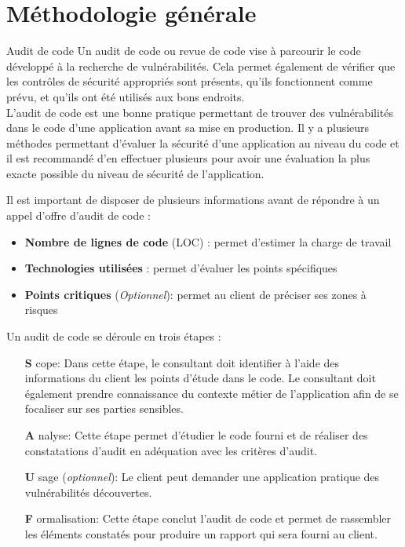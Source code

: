 \section{Méthodologie générale}

\begin{Define}{Audit de code}
Un audit de code ou revue de code vise à parcourir le code développé à la recherche de vulnérabilités. Cela permet également de vérifier que les contrôles de sécurité appropriés sont présents, qu'ils fonctionnent comme prévu, et qu'ils ont été utilisés aux bons endroits.\\
L’audit de code est une bonne pratique permettant de trouver des vulnérabilités dans le code d’une application avant sa mise en production. Il y a plusieurs méthodes permettant d’évaluer la sécurité d’une application au niveau du code et il est recommandé d’en effectuer plusieurs pour avoir une évaluation la plus exacte possible du niveau de sécurité de l’application.
\end{Define}
\begin{Pre}
Il est important de disposer de plusieurs informations avant de répondre à un appel d'offre d'audit de code :\begin{itemize}
\item \textbf{Nombre de lignes de code} (LOC) : permet d’estimer la charge de travail
\item \textbf{Technologies utilisées} : permet d'évaluer les points spécifiques
\item \textbf{Points critiques} (\textit{Optionnel}): permet au client de préciser ses zones à risques
\end{itemize}
\end{Pre}
Un audit de code se déroule en trois étapes :\begin{itemize}
\item[\textbf{S}]cope: 
Dans cette étape, le consultant doit identifier à l’aide des informations du client les points d'étude dans le code. Le consultant doit également prendre connaissance du contexte métier de l’application afin de se focaliser sur ses parties sensibles.
\item[\textbf{A}]nalyse: 
Cette étape permet d'étudier le code fourni et de réaliser des constatations d'audit en adéquation avec les critères d'audit.
\item[\textbf{U}]sage (\textit{optionnel}): Le client peut demander une application pratique des vulnérabilités découvertes.
\item[\textbf{F}]ormalisation: Cette étape conclut l’audit de code et permet de rassembler les éléments constatés pour produire un rapport qui sera fourni au client.
\end{itemize}

